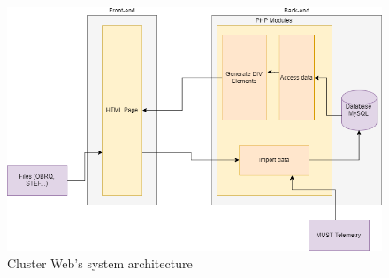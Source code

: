 \begin{figure}[ht]
  \begin{center}
    \includegraphics*[width=1\textwidth]{Architecture_CW}
  \end{center}
  \caption{Cluster Web's system architecture}
  \label{fig:architecture_cw}
\end{figure}